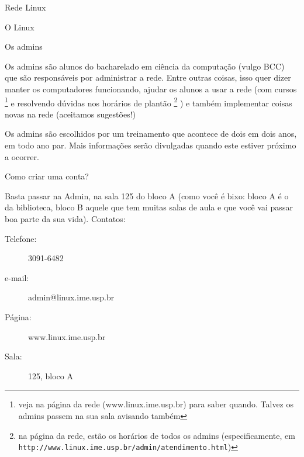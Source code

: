 \begin{secao}{Rede Linux}
\begin{subsecao}{O Linux}
\end{subsecao}

\begin{subsecao}{Os admins}

Os admins são alunos do bacharelado em ciência da computação (vulgo BCC) que
são responsáveis por administrar a rede. Entre outras coisas, isso quer dizer
manter os computadores funcionando, ajudar os alunos a usar a rede (com
cursos \footnote{veja na página da rede (www.linux.ime.usp.br) para saber
quando. Talvez os admins passem na sua sala avisando também} e resolvendo
dúvidas nos horários de plantão \footnote{na página da rede, estão os horários
de todos os admins (especificamente, em {\tt http://www.linux.ime.usp.br/admin/atendimento.html})}
) e também implementar coisas novas na rede (aceitamos sugestões!)

Os admins são escolhidos por um treinamento que acontece de dois em dois anos,
em todo ano par. Mais informações serão divulgadas quando este estiver próximo
a ocorrer.

\end{subsecao}
\begin{subsecao}{Como criar uma conta?}

Basta passar na Admin, na sala 125 do bloco A (como você é bixo: bloco A é o da
biblioteca, bloco B aquele que tem muitas salas de aula e que você vai passar boa 
parte da sua vida). Contatos:
\begin{description}

\item [Telefone:] 3091-6482
\item [e-mail:] admin@linux.ime.usp.br
\item [Página:] www.linux.ime.usp.br
\item [Sala:] 125, bloco A

\end{description}
\end{subsecao}
\end{secao}
